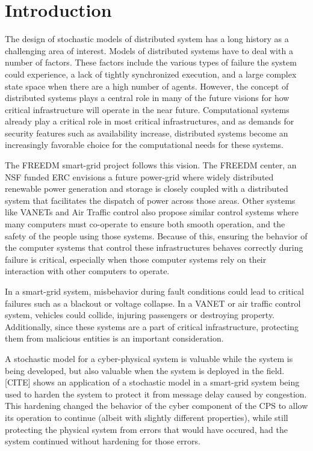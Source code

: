 \section{Introduction}

The design of stochastic models of distributed system has a long history as a challenging area of interest. Models of distributed systems have to deal with a number of factors. These factors include the various types of failure the system could experience, a lack of tightly synchronized execution, and a large complex state space when there are a high number of agents.  However, the concept of distributed systems plays a central role in many of the future visions for how critical infrastructure will operate in the near future. Computational systems already play a critical role in most critical infrastructures, and as demands for security features such as availability increase, distributed systems become an increasingly favorable choice for the computational needs for these systems.

The FREEDM smart-grid project follows this vision. The FREEDM center, an NSF funded ERC envisions a future power-grid where widely distributed renewable power generation and storage is closely coupled with a distributed system that facilitates the dispatch of power across those areas. Other systems like VANETs and Air Traffic control also propose similar control systems where many computers must co-operate to ensure both smooth operation, and the safety of the people using those systems. Because of this, ensuring the behavior of the computer systems that control these infrastructures behaves correctly during failure is critical, especially when those computer systems rely on their interaction with other computers to operate.

In a smart-grid system, misbehavior during fault conditions could lead to critical failures such as a blackout or voltage collapse. In a VANET or air traffic control system, vehicles could collide, injuring passengers or destroying property. Additionally, since these systems are a part of critical infrastructure, protecting them from malicious entities is an important consideration.

A stochastic model for a cyber-physical system is valuable while the system is being developed, but also valuable when the system is deployed in the field. [CITE] shows an application of a stochastic model in a smart-grid system being used to harden the system to protect it from message delay caused by congestion. This hardening changed the behavior of the cyber component of the CPS to allow its operation to continue (albeit with slightly different properties), while still protecting the physical system from errors that would have occured, had the system continued without hardening for those errors.

